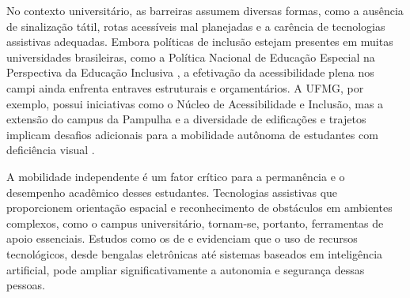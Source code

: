  No contexto universitário, as barreiras assumem diversas formas, como a ausência de sinalização tátil, rotas acessíveis mal planejadas e a carência de tecnologias assistivas adequadas. Embora políticas de inclusão estejam presentes em muitas universidades brasileiras, como a Política Nacional de Educação Especial na Perspectiva da Educação Inclusiva \cite{Brasil2008}, a efetivação da acessibilidade plena nos campi ainda enfrenta entraves estruturais e orçamentários. A UFMG, por exemplo, possui iniciativas como o Núcleo de Acessibilidade e Inclusão, mas a extensão do campus da Pampulha e a diversidade de edificações e trajetos implicam desafios adicionais para a mobilidade autônoma de estudantes com deficiência visual \cite{Oliveira2019}.

 A mobilidade independente é um fator crítico para a permanência e o desempenho acadêmico desses estudantes. Tecnologias assistivas que proporcionem orientação espacial e reconhecimento de obstáculos em ambientes complexos, como o campus universitário, tornam-se, portanto, ferramentas de apoio essenciais. Estudos como os de  e  evidenciam que o uso de recursos tecnológicos, desde bengalas eletrônicas até sistemas baseados em inteligência artificial, pode ampliar significativamente a autonomia e segurança dessas pessoas.
 
